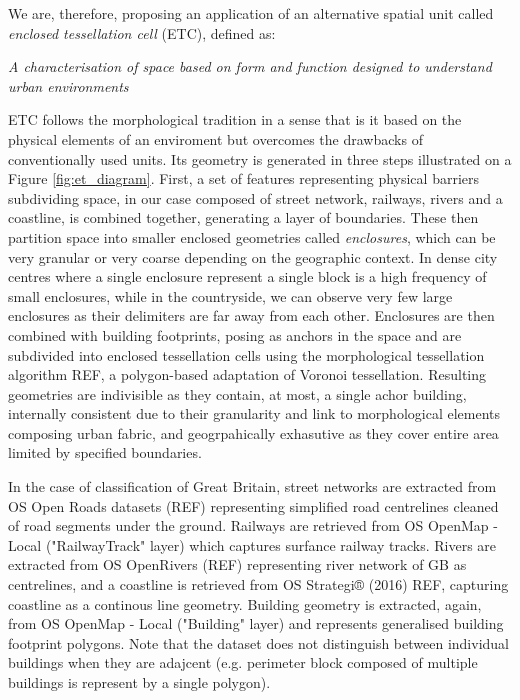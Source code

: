We are, therefore, proposing an application of an alternative spatial unit called \textit{enclosed
tessellation cell} (ETC), defined as:

\textit{A characterisation of space based on form and function designed to understand urban
environments}


ETC follows the morphological tradition in a sense that is it
based on the physical elements of an enviroment but overcomes the drawbacks of
conventionally used units. Its geometry is generated in three steps illustrated on a
Figure \ref{fig:et_diagram}. First, a set of features representing physical barriers
subdividing space, in our case composed of street network, railways, rivers and a
coastline, is combined together, generating a layer of boundaries. These then partition space
into smaller enclosed geometries called \textit{enclosures}, which can be very granular
or very coarse depending on the geographic context. In dense city centres where a single
enclosure represent a single block is a high frequency of small enclosures, while in the
countryside, we can observe very few large enclosures as their delimiters are far away
from each other. Enclosures are then combined with building footprints, posing as
anchors in the space and are subdivided into enclosed tessellation cells using the
morphological tessellation algorithm REF, a polygon-based adaptation of Voronoi
tessellation. Resulting geometries are indivisible as they contain, at most, a single
achor building, internally consistent due to their granularity and link to morphological
elements composing urban fabric, and geogrpahically exhasutive as they cover entire area
limited by specified boundaries.


In the case of classification of Great Britain, street networks are extracted from OS
Open Roads datasets (REF) representing simplified road centrelines cleaned of road
segments under the ground. Railways are retrieved from OS OpenMap - Local
("RailwayTrack" layer) which captures surfance railway tracks. Rivers are extracted from
OS OpenRivers (REF) representing river network of GB as centrelines, and a coastline is
retrieved from OS Strategi® (2016) REF, capturing  coastline as a continous line
geometry. Building geometry is extracted, again, from OS OpenMap - Local ("Building"
layer) and represents generalised building footprint polygons. Note that the dataset
does not distinguish between individual buildings when they are adajcent (e.g. perimeter
block composed of multiple buildings is represent by a single polygon).

